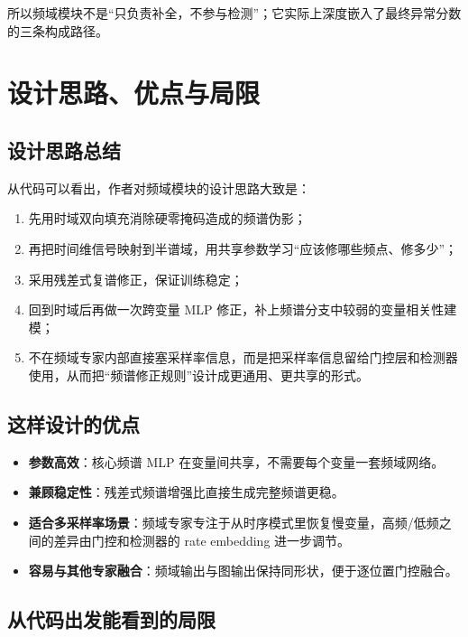 \documentclass[UTF8]{ctexart}
\begin{document}
所以频域模块不是“只负责补全，不参与检测”；它实际上深度嵌入了最终异常分数的三条构成路径。

\section{设计思路、优点与局限}

\subsection{设计思路总结}

从代码可以看出，作者对频域模块的设计思路大致是：
\begin{enumerate}
    \item 先用时域双向填充消除硬零掩码造成的频谱伪影；
    \item 再把时间维信号映射到半谱域，用共享参数学习“应该修哪些频点、修多少”；
    \item 采用残差式复谱修正，保证训练稳定；
    \item 回到时域后再做一次跨变量 MLP 修正，补上频谱分支中较弱的变量相关性建模；
    \item 不在频域专家内部直接塞采样率信息，而是把采样率信息留给门控层和检测器使用，从而把“频谱修正规则”设计成更通用、更共享的形式。
\end{enumerate}

\subsection{这样设计的优点}

\begin{itemize}
    \item \textbf{参数高效}：核心频谱 MLP 在变量间共享，不需要每个变量一套频域网络。
    \item \textbf{兼顾稳定性}：残差式频谱增强比直接生成完整频谱更稳。
    \item \textbf{适合多采样率场景}：频域专家专注于从时序模式里恢复慢变量，高频/低频之间的差异由门控和检测器的 rate embedding 进一步调节。
    \item \textbf{容易与其他专家融合}：频域输出与图输出保持同形状，便于逐位置门控融合。
\end{itemize}

\subsection{从代码出发能看到的局限}
\end{document}
